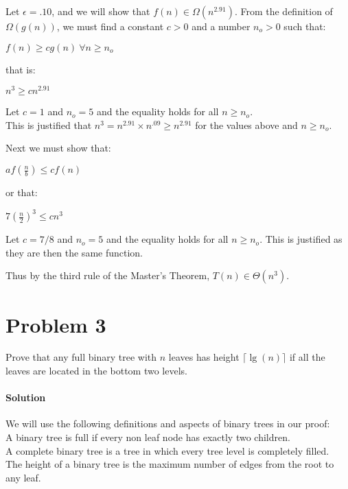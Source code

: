 \documentclass[12pt]{article}
\begin{document}
Let $\epsilon = .10$, and we will show that $f(n) \in \Omega(n^{2.91} )$.
From the definition of $\Omega(g(n))$, we must find a constant $c >0$ and a number $n_o > 0 $ such that: \\
\centerline{ $f(n) \geq c g(n) ~ \forall n \geq n_o$}
that is: \\
\centerline{ $n^{3} \geq c n^{2.91}$}
Let $c =1$ and $n_o = 5$ and the equality holds for all $n \geq n_o$.\\
This is justified that $n^3 = n^{2.91} \times n^{.09} \geq n^{2.91}$ for the values above and $n \geq n_o$.

Next we must show that: \\
\centerline{  $af(\frac{n}{b}) \leq cf(n)$ }
or that:\\
\centerline{$ 7( \frac{n}{2} )^3 \leq c n^{3} $}
Let $c = 7/8$ and $n_o = 5$ and the equality holds for all $n \geq n_o$.  This is justified as they are then the same function.

Thus by the third rule of the Master's Theorem, $T(n) \in \Theta( n^{3} )$.




\section{Problem 3}
Prove that any full binary tree with $n$ leaves has height $\lceil \lg(n) \rceil $ if all the leaves are located in the bottom two levels.

\paragraph{Solution}
We will use the following definitions and aspects of binary trees in our proof:\\

A binary tree is full if every non leaf node has exactly two children. \\
A complete binary tree is a tree in which every tree level is completely filled. \\
The height of a binary tree is the maximum number of edges from the root to any leaf. \\
\end{document}
